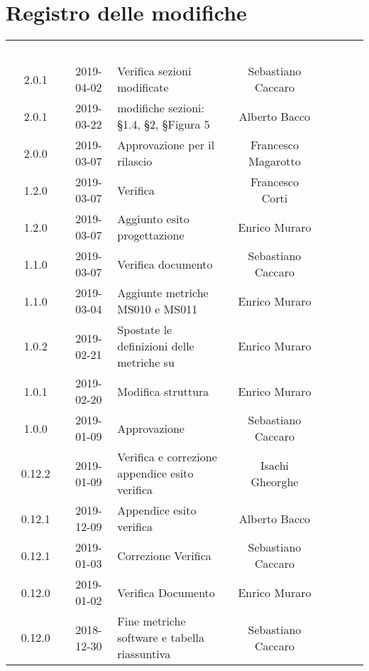 \section*{Registro delle modifiche}
{
	\renewcommand{\arraystretch}{1.5}
	\centering
	\begin{longtable}{c c C{4cm} c  c }
		\textcolor{white}{\textbf{Versione}} &
		\textcolor{white}{\textbf{Data}} &
		\textcolor{white}{\textbf{Descrizione}} &
		\textcolor{white}{\textbf{Nominativo}} &
		\textcolor{white}{\textbf{Ruolo}}
		\\
		2.0.1 &
		2019-04-02 &
		Verifica sezioni modificate &
		Sebastiano Caccaro &
		\ver{}	
		\\
		2.0.1 &
		2019-03-22 &
		modifiche sezioni: §1.4, §2, §Figura 5 &
		Alberto Bacco &
		\reda{}	
		\\
		2.0.0 &
		2019-03-07 &
		Approvazione per il rilascio &
		Francesco Magarotto &
		\Res{}
		\\		
		1.2.0 &
		2019-03-07 &
		Verifica &
		Francesco Corti &
		\ver{} \\
		1.2.0 &
		2019-03-07 &
		Aggiunto esito progettazione &
		Enrico Muraro &
		\reda{}
		\\
		1.1.0 &
		2019-03-07 &
		Verifica documento &
		Sebastiano Caccaro &
		\ver{}
		\\
		1.1.0 &
		2019-03-04 &
		Aggiunte metriche MS010 e MS011 &
		Enrico Muraro &
		\reda{}
		\\
		1.0.2 &
		2019-02-21 &
		Spostate le definizioni delle metriche su \NdP &
		Enrico Muraro &
		\reda{}
		\\
		1.0.1 &
		2019-02-20 &
		Modifica struttura &
		Enrico Muraro &
		\reda{}
		\\
		1.0.0 &
		2019-01-09 &
		Approvazione &
		Sebastiano Caccaro &
		\Res{}
		\\
		0.12.2 &
		2019-01-09 &
		Verifica e correzione appendice esito verifica &
		Isachi Gheorghe &
		\ver{}
		\\
		0.12.1 &
		2019-12-09 &
		Appendice esito verifica &
		Alberto Bacco &
		\ver{}
		\\
		0.12.1 &
		2019-01-03 &
		Correzione Verifica &
		Sebastiano Caccaro &
		\reda{}
		\\
		0.12.0 &
		2019-01-02 &
		Verifica Documento &
		Enrico Muraro &
		\ver{}
		\\
		0.12.0 &
		2018-12-30 &
		Fine metriche software e tabella riassuntiva &
		Sebastiano Caccaro &
		\reda{}
		\\

\end{longtable}}
